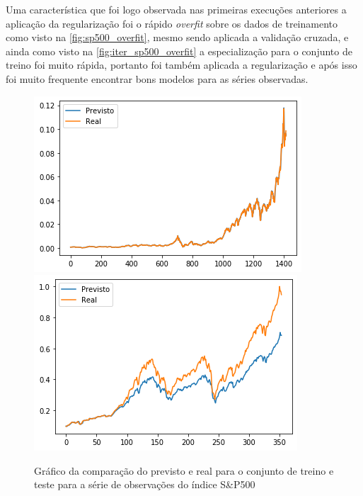 \documentclass[
    12pt,
    oneside,
    a4paper,
    english,
    brazil
]{abntex2}
\begin{document}
Uma característica que foi logo  observada nas primeiras execuções anteriores a
aplicação  da regularização  foi o  rápido \textit{overfit}  sobre os  dados de
treinamento como  visto na \autoref{fig:sp500_overfit}, mesmo  sendo aplicada a
validação  cruzada, e  ainda como  visto na  \autoref{fig:iter_sp500_overfit} a
especialização para o conjunto de treino  foi muito rápida, portanto foi também
aplicada a regularização e após isso foi muito frequente encontrar bons modelos
para as séries observadas.

\begin{figure}[ht]
    \centering
    \caption{Gráfico  da  comparação  do  previsto   e  real  para  o  conjunto
    de   treino   e   teste   para   a   série   de   observações   do   índice
    S\&P500}\label{fig:sp500_overfit}
        \includegraphics[width=\linewidth]{images/sp500_overfit_train.png}
    \endminipage\hfill
        \includegraphics[width=\linewidth]{images/sp500_overfit_test.png}
    \endminipage\hfill
\end{figure}
\end{document}
